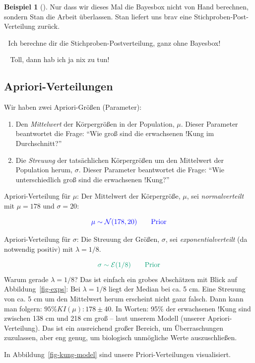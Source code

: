 \documentclass[
  ngerman,
  letterpaper,
  twoside,
  open=any]{scrbook}
\providecommand{\tightlist}{%
  \setlength{\itemsep}{0pt}\setlength{\parskip}{0pt}}\usepackage{longtable,booktabs,array}
\theoremstyle{definition}
\newtheorem{example}{Beispiel}[chapter]
\theoremstyle{plain}
\theoremstyle{definition}
\theoremstyle{definition}
\theoremstyle{remark}
\begin{document}
\begin{example}[]
Nur dass wir dieses Mal die Bayesbox nicht von Hand berechnen, sondern
Stan die Arbeit überlassen. Stan liefert uns brav eine
Stichproben-Post-Verteilung zurück.

🤖 Ich berechne dir die Stichproben-Postverteilung, ganz ohne Bayesbox!

🧑🏫 Toll, dann hab ich ja nix zu tun!

\subsection{Apriori-Verteilungen}\label{apriori-verteilungen}

Wir haben zwei Apriori-Größen (Parameter):

\begin{enumerate}
\def\labelenumi{\arabic{enumi}.}
\tightlist
\item
  Den \emph{Mittelwert} der Körpergrößen in der Population, \(\mu\).
  Dieser Parameter beantwortet die Frage: \enquote{Wie groß sind die
  erwachsenen !Kung im Durchschnitt?}
\item
  Die \emph{Streuung} der tatsächlichen Körpergrößen um den Mittelwert
  der Population herum, \(\sigma\). Dieser Parameter beantwortet die
  Frage: \enquote{Wie unterschiedlich groß sind die erwachsenen !Kung?}
\end{enumerate}

Apriori-Verteilung für \(\mu\): Der Mittelwert der Körpergröße, \(\mu\),
sei \emph{normalverteilt} mit \(\mu=178\) und \(\sigma=20\):

\[\color{blue}{\mu \sim \mathcal{N}(178, 20)} \qquad{\text{Prior}}\]

Apriori-Verteilung für \(\sigma\): Die Streuung der Größen, \(\sigma\),
sei \emph{exponentialverteilt} (da notwendig positiv) mit
\(\lambda = 1/8\).

\[\color[RGB]{0,158,115}{\sigma \sim \mathcal{E}(1/8)} \qquad{\text{Prior}}\]
Warum gerade \(\lambda=1/8\)? Das ist einfach ein grobes Abschätzen mit
Blick auf Abbildung~\ref{fig-exps}: Bei \(\lambda=1/8\) liegt der Median
bei ca. 5 cm. Eine Streuung von ca. 5 cm um den Mittelwert herum
erscheint nicht ganz falsch. Dann kann man folgern:
\(95\%KI(\mu): 178 \pm 40\). In Worten: 95\% der erwachsenen !Kung sind
zwischen 138 cm und 218 cm groß -- laut unserem Modell (unserer
Apriori-Verteilung). Das ist ein ausreichend großer Bereich, um
Überraschungen zuzulassen, aber eng genug, um biologisch unmögliche
Werte auszuschließen.

In Abbildung~\ref{fig-kung-model} sind unsere Priori-Verteilungen
visualisiert.


\end{example}
\end{document}
